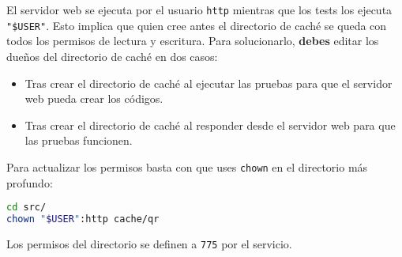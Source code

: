 El servidor web se ejecuta por el usuario \texttt{http} mientras que los tests los ejecuta \texttt{"\$USER"}.
Esto implica que quien cree antes el directorio de caché se queda con todos los permisos de lectura y escritura.
Para solucionarlo, \textbf{debes} editar los dueños del directorio de caché en dos casos:

\begin{itemize}
\item
	Tras crear el directorio de caché al ejecutar las pruebas para que el servidor web pueda crear los códigos.
\item
	Tras crear el directorio de caché al responder desde el servidor web para que las pruebas funcionen.
\end{itemize}

Para actualizar los permisos basta con que uses \texttt{chown} en el directorio más profundo:

\begin{lstlisting}[language=sh]
cd src/
chown "$USER":http cache/qr
\end{lstlisting}

Los permisos del directorio se definen a \texttt{775} por el servicio.
